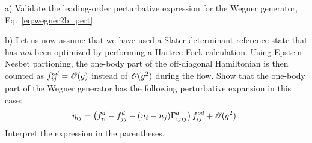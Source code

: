 \begin{prob}\label{problem:wegner_pert}
  \item[a)]
    Validate the leading-order perturbative expression for the Wegner generator, Eq.~\eqref{eq:wegner2b_pert}.
  \item[b)]
    Let us now assume that we have used a Slater determinant reference state that 
    has \emph{not} been optimized by performing a Hartree-Fock calculation. Using
    Epstein-Nesbet partioning, the one-body part of the off-diagonal Hamiltonian
    is then counted as $f^{od}_{ij}=\mathcal{O}(g)$ instead of $\mathcal{O}(g^2)$ during the flow.
    Show that the one-body part of the Wegner generator has the following perturbative
    expansion in this case: 
    \begin{equation}\label{eq:wegner1b_pert}
      \eta_{ij} = \left(f^d_{ii} - f^d_{jj} - (n_i-n_j)\Gamma^d_{ijij}\right)f^{od}_{ij} + \OC(g^2)\,.
    \end{equation}
    Interpret the expression in the parentheses.
\end{prob}

\begin{prob}
\end{prob}

\begin{prob}
\end{prob}

